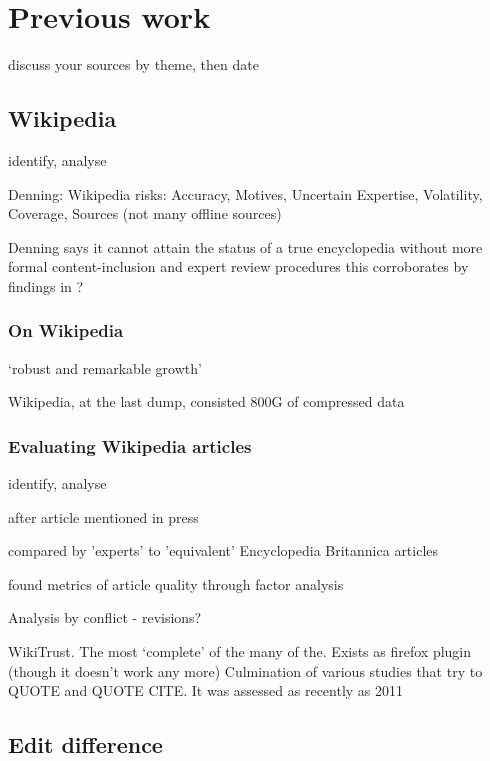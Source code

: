 \documentclass[a4paper,11pt,twoside,notitlepage]{article}
\begin{document}
        \section{Previous work}
        discuss your sources
        by theme, then date

        \subsection{Wikipedia}
        identify, analyse

        Denning: Wikipedia risks: Accuracy, Motives, Uncertain Expertise,
        Volatility, Coverage, Sources (not many offline sources)
        \cite{Denning2005} 

        Denning says it cannot attain the status of a true
        encyclopedia without more formal content-inclusion and expert
        review procedures\cite{Denning2005} this corroborates by
        findings in \cite{Giles2005}?

        \subsubsection{On Wikipedia}
        `robust and remarkable growth'
        \cite{Kittur2007}\cite{Voss2005} 
        
        Wikipedia, at the last dump, consisted 800G of compressed data
        \cite{wiki-dump}

        \subsubsection{Evaluating Wikipedia articles}
        identify, analyse

        after article mentioned in press \cite{Lih2004}

        compared by 'experts' to 'equivalent' Encyclopedia Britannica articles \cite{Giles2005}

        found metrics of article quality through factor analysis
        \cite{Stvilia2005}

        Analysis by conflict - revisions?\cite{Kittur2007}

        WikiTrust. The most `complete' of the many of the. Exists as
        firefox plugin (though it doesn't work any more) Culmination
        of various studies that try to QUOTE \cite{Adler2007} and QUOTE CITE. It
        was assessed as recently as 2011 \cite{Lucassen2011}
       
        \subsection{Edit difference}
\end{document}
